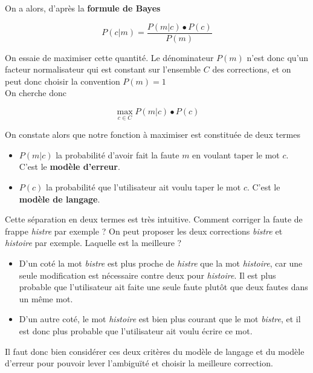 \documentclass[10pt,a4paper]{article}
\begin{document}
On a alors, d'après la \textbf{formule de Bayes}

\begin{equation}
P(c|m) = \frac{P(m|c) \bullet P(c)}{P(m)}
\end{equation}

On essaie de maximiser cette quantité. Le dénominateur $P(m)$ n'est donc qu'un facteur normalisateur qui est constant sur l'ensemble $C$ des corrections, et on peut donc choisir la convention $P(m) = 1$\\

On cherche donc 

\begin{equation}
\max\limits_{c \in C} P(m|c) \bullet P(c)
\end{equation}

On constate alors que notre fonction à maximiser est constituée de deux termes\\

\begin{itemize}
\item $P(m|c)$ la probabilité d'avoir fait la faute $m$ en voulant taper le mot $c$. C'est le \textbf{modèle d'erreur}.
\item $P(c)$ la probabilité que l'utilisateur ait voulu taper le mot $c$. C'est le \textbf{modèle de langage}.\\
\end{itemize}

Cette séparation en deux termes est très intuitive. Comment corriger la faute de frappe \textit{histre} par exemple ? On peut proposer les deux corrections \textit{bistre} et \textit{histoire} par exemple. Laquelle est la meilleure ?\\

\begin{itemize}
\item D'un coté la mot \textit{bistre} est plus proche de \textit{histre} que la mot \textit{histoire}, car une seule modification est nécessaire contre deux pour \textit{histoire}. Il est plus probable que l'utilisateur ait faite une seule faute plutôt que deux fautes dans un même mot.
\item D'un autre coté, le mot \textit{histoire} est bien plus courant que le mot \textit{bistre}, et il est donc plus probable que l'utilisateur ait voulu écrire ce mot.\\
\end{itemize}

Il faut donc bien considérer ces deux critères du modèle de langage et du modèle d'erreur pour pouvoir lever l'ambiguïté et choisir la meilleure correction.
\end{document}

